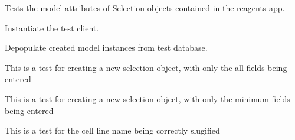 \documentclass[letterpaper,10pt,english]{sphinxmanual}
\begin{document}

\begin{fulllineitems}
\label{api:experimentdb.reagents.tests.SelectionModelTests}
Tests the model attributes of Selection objects contained in the reagents app.


\begin{fulllineitems}
\label{api:experimentdb.reagents.tests.SelectionModelTests.setUp}
Instantiate the test client.


\end{fulllineitems}


\begin{fulllineitems}
\label{api:experimentdb.reagents.tests.SelectionModelTests.tearDown}
Depopulate created model instances from test database.


\end{fulllineitems}


\begin{fulllineitems}
\label{api:experimentdb.reagents.tests.SelectionModelTests.test_create_selection_all_fields}
This is a test for creating a new selection object, with only the all fields being entered


\end{fulllineitems}


\begin{fulllineitems}
\label{api:experimentdb.reagents.tests.SelectionModelTests.test_create_selection_minimal}
This is a test for creating a new selection object, with only the minimum fields being entered


\end{fulllineitems}


\begin{fulllineitems}
\label{api:experimentdb.reagents.tests.SelectionModelTests.test_selection_slugify}
This is a test for the cell line name being correctly slugified


\end{fulllineitems}


\end{fulllineitems}
\end{document}
